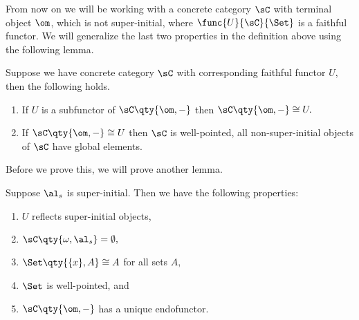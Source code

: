 \documentclass[main.tex]{subfiles}
\begin{document}
From now on we will be working with a concrete category $\sC$ with terminal
object $\om$, which is not super-initial, where $\func{U}{\sC}{\Set}$ is a
faithful functor. We will generalize the last two properties in the definition
above using the following lemma.

\begin{lemma}

	Suppose we have concrete category $\sC$ with corresponding faithful functor $U$, then the following holds.

	\begin{enumerate}

		\item If $U$ is a subfunctor of $\sC\qty{\om,-}$ then $\sC\qty{\om,-} \cong U.$
		\item If $\sC\qty{\om,-} \cong U$ then $\sC$ is well-pointed, all non-super-initial objects of $\sC$ have global elements.

	\end{enumerate}



\end{lemma}

Before we prove this, we will prove another lemma.

\begin{lemma}

	Suppose $\al_{s}$ is super-initial. Then we have the following properties:

	\begin{enumerate}
		\item $U$ reflects super-initial objects,
		\item $\sC\qty{\omega,\al_{s}} = \emptyset,$
		\item $\Set\qty{\{x\},A } \cong A$ for all sets $A,$
		\item $\Set$ is well-pointed, and
		\item $\sC\qty{\om,-}$ has a unique endofunctor.
	\end{enumerate}

\end{lemma}
\end{document}
